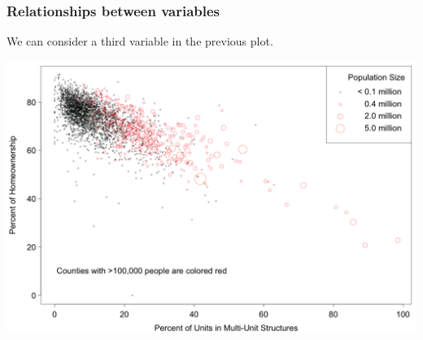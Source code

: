 \documentclass[handout]{beamer}
\begin{document}
\begin{frame}[fragile]
\frametitle{Relationships between variables}
We can consider a third variable in the previous plot.
\begin{center}
\includegraphics[width=\textwidth]{figure/MHP.png}
\end{center}
\end{frame}
\end{document}
